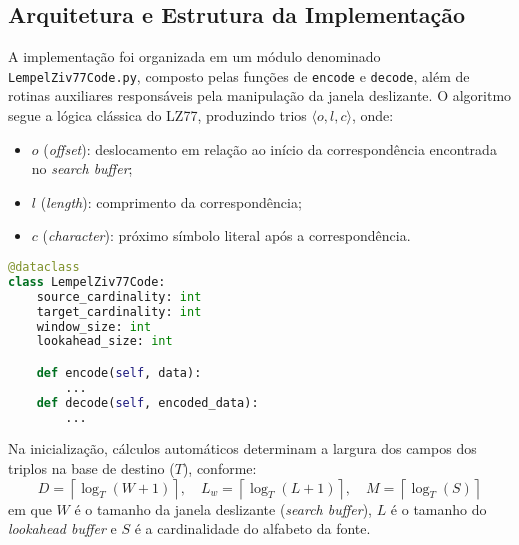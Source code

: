 \subsection{Arquitetura e Estrutura da Implementação}
A implementação foi organizada em um módulo denominado
\texttt{LempelZiv77Code.py}, composto pelas funções de \texttt{encode} e
\texttt{decode}, além de rotinas auxiliares responsáveis pela manipulação da
janela deslizante. O algoritmo segue a lógica clássica do LZ77, produzindo
trios $\langle o, l, c \rangle$, onde:
\begin{itemize}
    \item $o$ (\textit{offset}): deslocamento em relação ao início da correspondência encontrada no \textit{search buffer};
    \item $l$ (\textit{length}): comprimento da correspondência;
    \item $c$ (\textit{character}): próximo símbolo literal após a correspondência.
\end{itemize}
\begin{lstlisting}[language=Python, caption={Estrutura simplificada da classe LZ77}]
@dataclass
class LempelZiv77Code:
    source_cardinality: int
    target_cardinality: int
    window_size: int
    lookahead_size: int

    def encode(self, data):
        ...
    def decode(self, encoded_data):
        ...
\end{lstlisting}


Na inicialização, cálculos automáticos determinam a largura dos campos dos
triplos na base de destino ($T$), conforme:
\[
    D = \left\lceil \log_T(W+1) \right\rceil, \quad
    L_w = \left\lceil \log_T(L+1) \right\rceil, \quad
    M = \left\lceil \log_T(S) \right\rceil
\]
em que $W$ é o tamanho da janela deslizante (\textit{search buffer}), $L$ é o
tamanho do \textit{lookahead buffer} e $S$ é a cardinalidade do alfabeto da
fonte.


%
%

